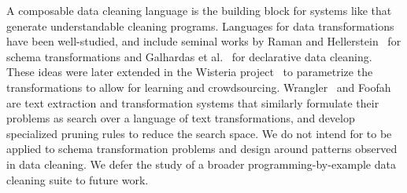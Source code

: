  A composable data cleaning language is the building block for systems like \sys that generate understandable cleaning programs.   Languages for data transformations have been well-studied, and include seminal works by Raman and Hellerstein~\cite{raman2001potter} for schema transformations and Galhardas et al.~\cite{DBLP:conf/vldb/GalhardasFSSS01} for declarative data cleaning. These ideas were later extended in the Wisteria project~\cite{DBLP:journals/pvldb/HaasKWF015} to parametrize the transformations to allow for learning and crowdsourcing.   Wrangler~\cite{wrangler} and Foofah~\cite{jin2017foofah} are text extraction and transformation systems that similarly formulate their problems as search over a language of text transformations, and develop specialized pruning rules to reduce the search space. We do not intend for \sys to be applied to schema transformation problems and design \sys around patterns observed in data cleaning.
We defer the study of a broader programming-by-example data cleaning suite to future work.



